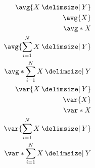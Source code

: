 \documentclass[preview]{standalone}
\begin{document}
\begin{align*}
 \avg{X \given Y} \\
 \avg{X} \\ 
	\avg*{X} \\ 
	\avg{\sum_{i=1}^{N}X \given Y} \\
	\avg*{\sum_{i=1}^{N}X \given Y} \\
	\var{X \given Y} \\ 
 \var{X} \\ 
	\var*{X} \\
	\var{\sum_{i=1}^{N}X \given Y} \\
	\var*{\sum_{i=1}^{N}X \given Y} \\
\end{align*}
\end{document}
